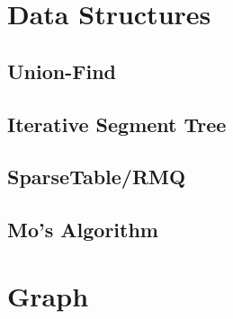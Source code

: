 \section{Data Structures}
\subsection{Union-Find}
\raggedbottom
\vspace{-.7\baselineskip}\hrulefill
\vspace{0.1\baselineskip}\subsection{Iterative Segment Tree}
\raggedbottom
\vspace{-.7\baselineskip}\hrulefill
\vspace{0.1\baselineskip}\subsection{SparseTable/RMQ}
\raggedbottom
\vspace{-.7\baselineskip}\hrulefill
\vspace{0.1\baselineskip}\subsection{Mo's Algorithm}
\raggedbottom
\vspace{-.7\baselineskip}\hrulefill
\vspace{0.1\baselineskip}
\section{Graph}
